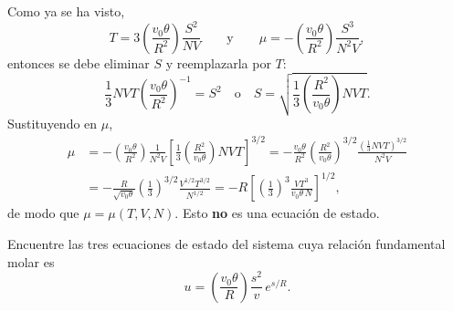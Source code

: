 \begin{solucion}
  Como ya se ha visto,
  \begin{equation*}
    T=3\left(\frac{v_0\theta}{R^{2}}\right)\frac{S^{2}}{NV}
    \qquad\text{y}\qquad
    \mu=-\left(\frac{v_0\theta}{R^{2}}\right)\frac{S^{3}}{N^{2}V},
  \end{equation*}
  entonces se debe eliminar $S$ y reemplazarla por $T$:
  \begin{equation*}
    \frac{1}{3}NVT\left(\frac{v_0\theta}{R^{2}}\right)^{-1}=S^{2}
    \quad\text{o}\quad
    S=\sqrt{\frac{1}{3}\left(\frac{R^{2}}{v_0\theta}\right)NVT}.
  \end{equation*}
  Sustituyendo en $\mu$,
  \begin{align*}
    \mu&=-\left(\frac{v_0\theta}{R^{2}}\right)\frac{1}{N^{2}V}\left[\frac{1}{3}\left(\frac{R^{2}}{v_0\theta}\right)NVT\right]^{3/2}
      =-\frac{v_0\theta}{R^{2}}\left(\frac{R^{2}}{v_0\theta}\right)^{3/2}\frac{\left(\frac{1}{3}NVT\right)^{3/2}}{N^{2}V}\\
    &=-\frac{R}{\sqrt{v_0\theta}}\left(\frac{1}{3}\right)^{3/2}\frac{V^{1/2}T^{3/2}}{N^{1/2}}
      =-R\left[\left(\frac{1}{3}\right)^{3}\frac{VT^{3}}{v_0\theta\,N}\right]^{1/2},
  \end{align*}
  de modo que $\mu=\mu(T,V,N)$. Esto \textbf{no} es una ecuación de estado.
\end{solucion}

\begin{ejercicio}
  Encuentre las tres ecuaciones de estado del sistema cuya relación fundamental molar es
  \begin{equation*}
    u=\left(\frac{v_0\theta}{R}\right)\frac{s^{2}}{v}\,e^{s/R}.
  \end{equation*}
\end{ejercicio}

